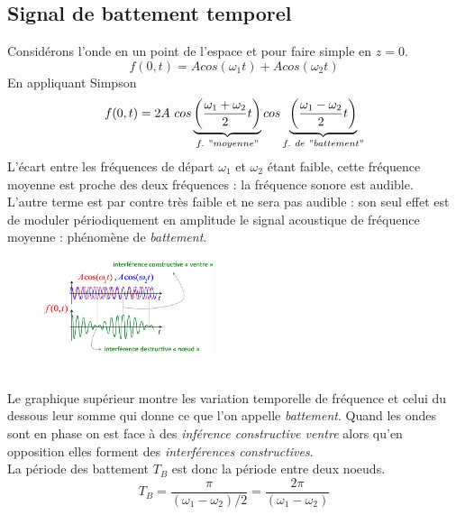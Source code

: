 \documentclass	[11pt, a4paper, openany]{book}
\begin{document}
\subsection{Signal de battement temporel}
Considérons l'onde en un point de l'espace et pour faire simple en $z = 0$.
\begin{equation}
f(0,t) = Acos(\omega_1 t) + Acos(\omega_2 t)
\end{equation}
En appliquant Simpson
\begin{equation}
f(0,t) = 2A\ cos\underbrace{\left(\frac{\omega_1 + \omega_2}{2}t\right)}_{f.\ "moyenne"}cos\underbrace{\left(\frac{\omega_1 - \omega_2}{2}t\right)}_{f.\ de\ "battement"}
\end{equation}
L'écart entre les fréquences de départ $\omega_1$ et $\omega_2$ étant faible, cette fréquence moyenne est proche des deux fréquences : la fréquence sonore est audible. \\
L'autre terme est par contre très faible et ne sera pas audible : son seul effet est de moduler périodiquement en amplitude le signal acoustique de fréquence moyenne : phénomène de \textit{battement}.\\
\begin{figure}
\includegraphics[width=5cm]{oo/image39.png}
\end{figure}
\ \\
Le graphique supérieur montre les variation temporelle de fréquence et celui du dessous leur somme qui donne ce que l'on appelle \textit{battement}. Quand les ondes sont en phase on est face à des \textit{inférence constructive ventre} alors qu'en opposition elles forment des \textit{interférences constructives}.\\

La période des battement $T_B$ est donc la période entre deux noeuds.
\begin{equation}
T_B = \frac{\pi}{(\omega_1 - \omega_2)/2} = \frac{2\pi}{(\omega_1 - \omega_2)}
\end{equation}
\end{document}
